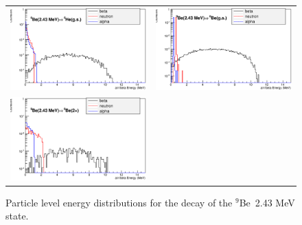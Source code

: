 \documentclass{JINST}
\newcommand{\beNINE}{$^{9}$Be~}
\begin{document}
\begin{figure}[htp]
\label{Particle_level_energies}

  \centering
    
  \begin{tabular}{cc}

    \includegraphics[width=70mm]{a_n_beta_spect_c1.eps} &
    \includegraphics[width=70mm]{a_n_beta_spect_c2.eps} \\

    \includegraphics[width=70mm]{a_n_beta_spect_c3.eps}\\
    
   \end{tabular}
 \caption{Particle level energy distributions for the decay of the \beNINE 2.43 MeV state.}
    \end{figure}
\end{document}
